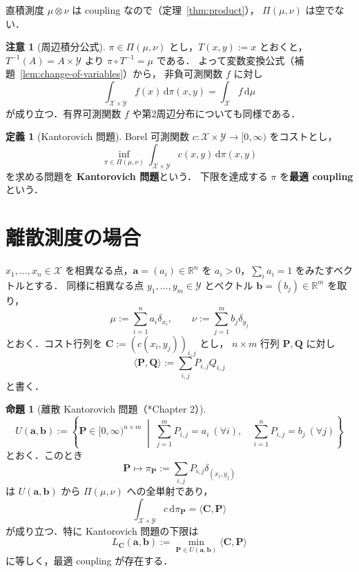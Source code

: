 \documentclass[12pt,a4j,twoside]{jreport}
\numberwithin{equation}{chapter}
\theoremstyle{definition} %
\newtheorem{prop}[thm]{命題}
\newtheorem{dfn}[thm]{定義}
\newtheorem{rem}[thm]{注意}
\newcommand{\R}{{\mathbb R}} %
\newcommand{\X}{\mathcal{X}}
\newcommand{\Y}{\mathcal{Y}}
\newcommand{\Couplings}{\Pi}
\newcommand{\inner}[2]{\langle #1,#2\rangle}
\renewcommand{\d}{\mathrm{d}} %
\begin{document}
直積測度 $\mu\otimes\nu$ は coupling なので（定理~\ref{thm:product}），
$\Couplings(\mu,\nu)$ は空でない．

\begin{rem}[周辺積分公式]\label{rem:marginal}
  $\pi\in\Couplings(\mu,\nu)$ とし，$T(x,y):=x$ とおくと，
  $T^{-1}(A)=A\times\Y$ より $\pi\circ T^{-1}=\mu$ である．
  よって変数変換公式（補題~\ref{lem:change-of-variables}）から，
  非負可測関数 $f$ に対し
  \[
    \int_{\X\times\Y}f(x)\,\d\pi(x,y)=\int_\X f\,\d\mu
  \]
  が成り立つ．有界可測関数 $f$ や第2周辺分布についても同様である．
\end{rem}

\begin{dfn}[Kantorovich 問題]\label{dfn:kantorovich}
  Borel 可測関数 $c\colon\X\times\Y\to[0,\infty)$ をコストとし，
  \[
    \inf_{\pi\in\Couplings(\mu,\nu)}\int_{\X\times\Y}c(x,y)\,\d\pi(x,y)
  \]
  を求める問題を \textbf{Kantorovich 問題}という．
  下限を達成する $\pi$ を\textbf{最適 coupling} という．
\end{dfn}

\section{離散測度の場合}

$x_1,\dots,x_n\in\X$ を相異なる点，$\mathbf{a}=(a_i)\in\R^n$ を
$a_i>0$，$\sum_ia_i=1$ をみたすベクトルとする．
同様に相異なる点 $y_1,\dots,y_m\in\Y$ とベクトル $\mathbf{b}=(b_j)\in\R^m$ を取り，
\[
  \mu:=\sum_{i=1}^na_i\delta_{x_i},\qquad
  \nu:=\sum_{j=1}^mb_j\delta_{y_j}
\]
とおく．コスト行列を $\mathbf{C}:=(c(x_i,y_j))_{i,j}$ とし，
$n\times m$ 行列 $\mathbf{P},\mathbf{Q}$ に対し
\[
  \inner{\mathbf{P}}{\mathbf{Q}}:=\sum_{i,j}P_{i,j}Q_{i,j}
\]
と書く．

\begin{prop}[離散 Kantorovich 問題（\cite{PeyreCuturi}*{Chapter 2}）]\label{prop:discrete}
  \[
    U(\mathbf{a},\mathbf{b})
    :=
    \left\{
      \mathbf{P}\in[0,\infty)^{n\times m}
      \;\middle|\;
      \sum_{j=1}^mP_{i,j}=a_i\ (\forall i),\quad
      \sum_{i=1}^nP_{i,j}=b_j\ (\forall j)
    \right\}
  \]
  とおく．このとき
  \[
    \mathbf{P}\longmapsto\pi_{\mathbf{P}}:=\sum_{i,j}P_{i,j}\delta_{(x_i,y_j)}
  \]
  は $U(\mathbf{a},\mathbf{b})$ から $\Couplings(\mu,\nu)$ への全単射であり，
  \[
    \int_{\X\times\Y}c\,\d\pi_{\mathbf{P}}=\inner{\mathbf{C}}{\mathbf{P}}
  \]
  が成り立つ．特に Kantorovich 問題の下限は
  \[
    L_{\mathbf{C}}(\mathbf{a},\mathbf{b})
    :=\min_{\mathbf{P}\in U(\mathbf{a},\mathbf{b})}\inner{\mathbf{C}}{\mathbf{P}}
  \]
  に等しく，最適 coupling が存在する．
\end{prop}
\end{document}
